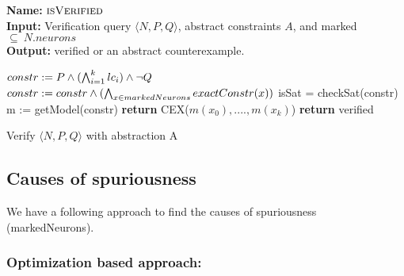 \begin{algorithm}[t]
  \textbf{Name: } $\textsc{isVerified}$ \\
  \textbf{Input: } Verification query $\langle N,P,Q \rangle$, abstract constraints $A$, and marked $\subseteq ~ N.neurons$ \\
  \textbf{Output: } verified or an abstract counterexample. 
  \begin{algorithmic}[1]
    \State $constr := P \land (\bigwedge_{i=1}^k lc_i)\land \neg Q$
    \State $constr := constr \land (\bigwedge_{x \in markedNeurons} exactConstr(x))$ 
    \State isSat = checkSat(constr)
      \State m := getModel(constr)
      \State \textbf{return} CEX($m(x_0),....,m(x_k)$)
    \Else
      \State \textbf{return} verified
    \EndIf
  \end{algorithmic}
  \caption{Verify $\langle N,P,Q \rangle$ with abstraction A}
  \label{algo:verif1}
\end{algorithm}



\subsection{Causes of spuriousness} 
We have a following approach to find the causes of spuriousness (markedNeurons). 

\subsubsection{Optimization based approach: }

